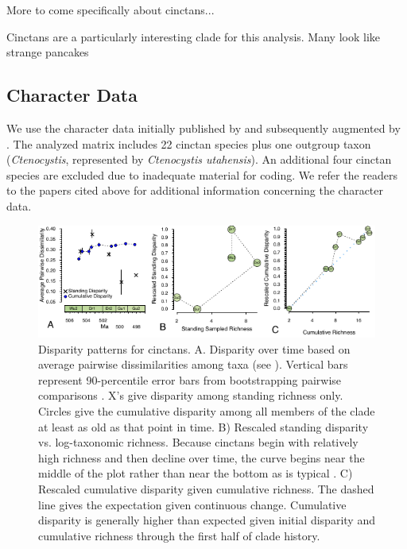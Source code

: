 \documentclass{article}
\begin{document}
More to come specifically about cinctans... 

Cinctans are a particularly interesting clade for this analysis.
Many look like strange pancakes 
\subsection{Character Data}
We use the character data initially published by \citep{Smith2009} and subsequently augmented by \citep{Zamora2013}.  The analyzed matrix includes 22 cinctan species plus one outgroup taxon (\textit{Ctenocystis}, represented by \textit{Ctenocystis utahensis}). An additional four cinctan species are excluded due to inadequate material for coding.  We refer the readers to the papers cited above for additional information concerning the character data.

\begin{figure}
  \includegraphics[width=\textwidth]{figures/Cinctan Disparity 3Ways Horizontal.pdf}

  \caption{Disparity patterns for cinctans.  A. Disparity over time based on average pairwise dissimilarities among taxa (see \cite{Foote1992}).  Vertical bars represent 90-percentile error bars from bootstrapping pairwise comparisons \citep{Foote1993}.  X’s give disparity among standing richness only.  Circles give the cumulative disparity among all members of the clade at least as old as that point in time.  B) Rescaled standing disparity vs. log-taxonomic richness. Because cinctans begin with relatively high richness and then decline over time, the curve begins near the middle of the plot rather than near the bottom as is typical \citep{Jablonski2020}. C) Rescaled cumulative disparity given cumulative richness.  The dashed line gives the expectation given continuous change.  Cumulative disparity is generally higher than expected given initial disparity and cumulative richness through the first half of clade history.}
\end{figure}
\end{document}
